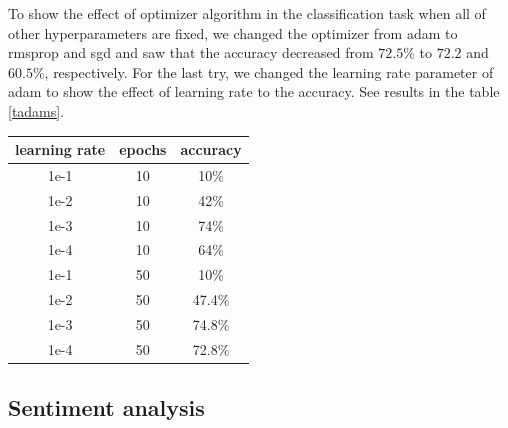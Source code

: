 \documentclass[10pt]{SelfArx} %
\begin{document}
To show the effect of optimizer algorithm in the classification task when all of other hyperparameters are fixed, we changed the optimizer from adam to rmsprop and sgd and saw that the accuracy decreased from $72.5\%$ to $72.2$ and $60.5\%$, respectively. 
For the last try, we changed the learning rate parameter of adam  to show the effect of learning rate to the accuracy.  See results in the table \ref{tadams}.
\begin{center}
	\begin{tabular*}{.85\linewidth}{@{\extracolsep{\fill} }ccc@{}}
		\toprule
learning rate & epochs &accuracy \\ \midrule
1e-1&10 & 10\% \\
1e-2&10 & 42\% \\
1e-3 &10& 74\% \\
1e-4 &10& 64\% \\ 

1e-1 &50 & 10\% \\
1e-2 &50 & 47.4\% \\
1e-3 &50& 74.8\% \\
1e-4 &50& 72.8\% \\ 
\bottomrule
	\end{tabular*}
	\label{tadams}
\end{center}

\subsection{Sentiment analysis}
\end{document}
